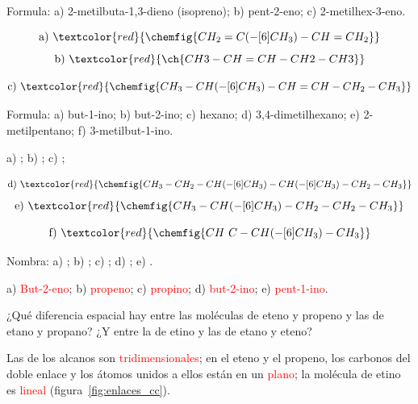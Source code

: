 \begin{exercise}
    Formula: a) 2-metilbuta-1,3-dieno (isopreno); b) pent-2-eno; c) 2-metilhex-3-eno.
    \begin{solu}
        \[ \text{a)}\ \textcolor{red}{\chemfig{CH_2=C(-[6]CH_3)-CH=CH_2}} \]
        \[ \text{b)}\ \textcolor{red}{\ch{CH3-CH=CH-CH2-CH3}} \]

        \[ \text{c)}\ \textcolor{red}{\chemfig{CH_3-CH(-[6]CH_3)-CH=CH-CH_2-CH_3}} \]
    \end{solu}
\end{exercise}

\begin{exercise}
    Formula: a) but-1-ino; b) but-2-ino; c) hexano; d) 3,4-dimetilhexano; e) 2-metilpentano; f) 3-metilbut-1-ino.
    \begin{solu}
        a) \textcolor{red}{}; b) \textcolor{red}{};
        c) \textcolor{red}{};

        \[ \text{d)}\ \textcolor{red}{\chemfig{CH_3-CH_2-CH(-[6]CH_3)-CH(-[6]CH_3)-CH_2-CH_3}} \]
        \[ \text{e)}\ \textcolor{red}{\chemfig{CH_3-CH(-[6]CH_3)-CH_2-CH_2-CH_3}} \]

        \[ \text{f)}\ \textcolor{red}{\chemfig{CH~C-CH(-[6]CH_3)-CH_3}} \]
    \end{solu}
\end{exercise}

\begin{exercise}
    Nombra: a) ; b) ; c) ; d) ; e) .
    \begin{solu}
        a) \textcolor{red}{But-2-eno}; b) \textcolor{red}{propeno}; c) \textcolor{red}{propino}; d) \textcolor{red}{but-2-ino}; e) \textcolor{red}{pent-1-ino}.
    \end{solu}
\end{exercise}

\begin{exercise}
    ¿Qué diferencia espacial hay entre las moléculas de eteno y propeno y las de etano y propano? ¿Y entre la de etino y las de etano y eteno?
    \begin{solu}
        Las de los alcanos son \textcolor{red}{tridimensionales}; en el eteno y el propeno, los carbonos del doble enlace y los átomos unidos a ellos están en un \textcolor{red}{plano}; la molécula de etino es \textcolor{red}{lineal} (figura~\ref{fig:enlaces_cc}).
    \end{solu}
\end{exercise}

